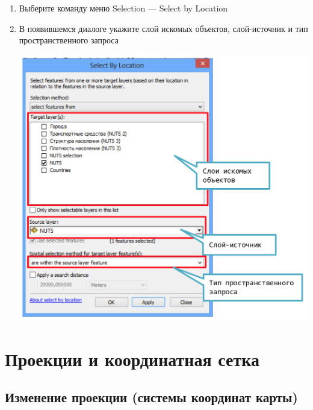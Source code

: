 \documentclass[]{book}
\theoremstyle{definition}
\theoremstyle{definition}
\theoremstyle{definition}
\theoremstyle{remark}
\begin{document}
\begin{enumerate}
\def\labelenumi{\arabic{enumi}.}
\item
  Выберите команду меню Selection --- Select by Location
\item
  В появившемся диалоге укажите слой искомых объектов, слой-источник и
  тип пространственного запроса

  \includegraphics{images/Appendix/image74.png}
\end{enumerate}

\hypertarget{manual-projections}{%
\chapter{Проекции и координатная сетка}\label{manual-projections}}

\hypertarget{manual-projections-change}{%
\section{Изменение проекции (системы координат
карты)}\label{manual-projections-change}}
\end{document}
